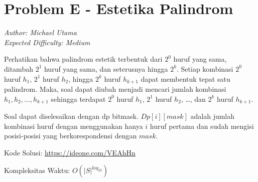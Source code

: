 \section*{Problem E - Estetika Palindrom}
\textit{Author: Michael Utama}
\\
\textit{Expected Difficulty: Medium}

Perhatikan bahwa palindrom estetik terbentuk dari $2^0$ huruf yang sama, ditambah $2^1$ huruf yang sama, dan seterusnya hingga $2^k$. Setiap kombinasi $2^0$ huruf $h_1$, $2^1$ huruf $h_2$, hingga $2^k$ huruf $h_{k+1}$ dapat membentuk tepat satu palindrom. Maka, soal dapat diubah menjadi mencari jumlah kombinasi $h_1, h_2, …, h_{k+1}$ sehingga terdapat $2^0$ huruf $h_1$, $2^1$ huruf $h_2$, …, dan $2^k$ huruf $h_{k+1}$.

Soal dapat diselesaikan dengan dp bitmask. $Dp[i][mask]$ adalah jumlah kombinasi huruf dengan menggunakan hanya $i$ huruf pertama dan sudah mengisi posisi-posisi yang berkorespondensi dengan $mask$.


Kode Solusi: \url{https://ideone.com/VEAhHn}

Kompleksitas Waktu: $O(|S|^{log_23})$
